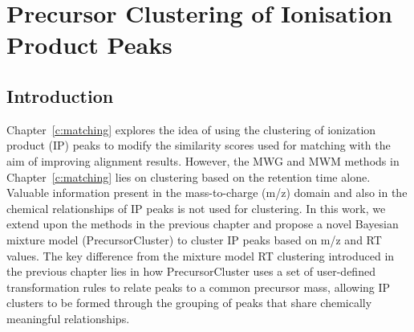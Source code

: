 \chapter{Precursor Clustering of Ionisation Product Peaks}
\label{c:precursor-clustering}

\section{Introduction}


Chapter~\ref{c:matching} explores the idea of using the clustering of ionization product (IP) peaks to modify the similarity scores used for matching with the aim of improving alignment results. However, the MWG and MWM methods in Chapter~\ref{c:matching} lies on clustering based on the retention time alone. Valuable information present in the mass-to-charge (m/z) domain and also in the chemical relationships of IP peaks is not used for clustering. In this work, we extend upon the methods in the previous chapter and propose a novel Bayesian mixture model (PrecursorCluster) to cluster IP peaks based on m/z and RT values. The key difference from the mixture model RT clustering introduced in the previous chapter lies in how PrecursorCluster uses a set of user-defined transformation rules to relate peaks to a common precursor mass, allowing IP clusters to be formed through the grouping of peaks that share chemically meaningful relationships. 

